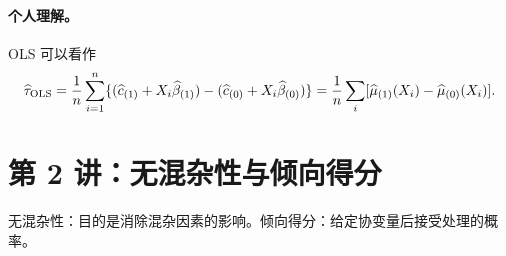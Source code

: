 \paragraph{个人理解。}
OLS 可以看作
\[
\widehat\tau_{\rm OLS}=\frac1n\sum_{i=1}^n
\{(\widehat c_{(1)}+X_i\widehat\beta_{(1)})
 -(\widehat c_{(0)}+X_i\widehat\beta_{(0)})\}
=\frac1n\sum_i[\widehat\mu_{(1)}(X_i)-\widehat\mu_{(0)}(X_i)].
\]

\section{第 2 讲：无混杂性与倾向得分}
无混杂性：目的是消除混杂因素的影响。倾向得分：给定协变量后接受处理的概率。
